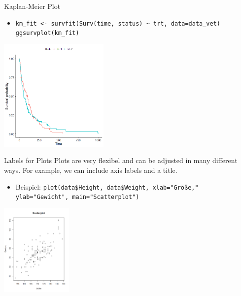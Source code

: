 \documentclass[xcolor=dvipsnames, aspectratio = 169]{beamer}
\begin{document}
\begin{frame}[fragile]{Kaplan-Meier Plot}
	\begin{itemize}
		\item \verb+km_fit <- survfit(Surv(time, status) ~ trt, data=data_vet)+ \\ \verb+ggsurvplot(km_fit)+
	\end{itemize}
			
	\begin{center}
		\includegraphics[height=5.5cm]{KM3}
	\end{center}
\end{frame}

\begin{frame}[fragile]{Labels for Plots}
	Plots are very flexibel and can be adjusted in many different ways. For example, we can include axis labels and a title.
	\begin{itemize}
		\item Beispiel: \verb+plot(data$Height, data$Weight, xlab="Größe,"+
		\verb+            ylab="Gewicht", main="Scatterplot")+
	\end{itemize}
			
	\begin{center}
		\includegraphics[height=4.5cm]{AnnotatedPlot}
	\end{center}
\end{frame}
\end{document}
